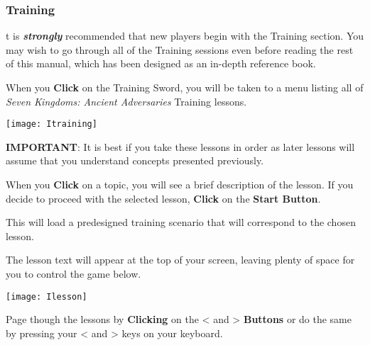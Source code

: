 \subsubsection{Training}



t is \textbf{\textit{strongly}} recommended that new players begin with the Training section. You may wish to go through all of the Training sessions even before reading the rest of this manual, which has been designed as an in-depth reference book.

When you \textbf{Click} on the Training Sword, you will be taken to a menu listing all of \textit{Seven Kingdoms: Ancient Adversaries} Training lessons.


\begin{center}
	\texttt{[image: Itraining]} %
\end{center}


\textbf{IMPORTANT}: It is best if you take these lessons in order as later lessons will assume that you understand concepts presented previously.

When you \textbf{Click} on a topic, you will see a brief description of the lesson. If you decide to proceed with the selected lesson, \textbf{Click} on the \textbf{Start Button}.

This will load a predesigned training scenario that will correspond to the chosen lesson.

The lesson text will appear at the top of your screen, leaving plenty of space for you to control the game below.

\begin{center}
	\texttt{[image: Ilesson]} %
\end{center}


Page though the lessons by \textbf{Clicking} on the \textless \hspace{1pt} and \textgreater \hspace{1pt} \textbf{Buttons} or do the same by pressing your \textless \hspace{1pt} and \textgreater \hspace{1pt} keys on your keyboard.

